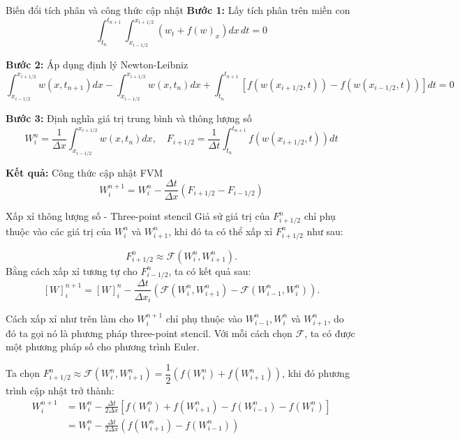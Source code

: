 \documentclass[aspectratio=43,10pt]{beamer}
\begin{document}
\begin{frame}{Biến đổi tích phân và công thức cập nhật}
\textbf{Bước 1:} Lấy tích phân trên miền con
$$\int_{t_n}^{t_{n+1}} \int_{x_{i-1/2}}^{x_{i+1/2}} \left( w_t + f(w)_x \right) dx \, dt = 0$$

\textbf{Bước 2:} Áp dụng định lý Newton-Leibniz
$$\int_{x_{i-1/2}}^{x_{i+1/2}} w(x, t_{n+1}) dx - \int_{x_{i-1/2}}^{x_{i+1/2}} w(x, t_n) dx + \int_{t_n}^{t_{n+1}} [f(w(x_{i+1/2}, t)) - f(w(x_{i-1/2}, t))] dt = 0$$

\textbf{Bước 3:} Định nghĩa giá trị trung bình và thông lượng số
$$W_i^n = \frac{1}{\Delta x}\int_{x_{i-1/2}}^{x_{i+1/2}} w(x, t_n) dx, \quad F_{i+1/2} = \frac{1}{\Delta t}\int_{t_n}^{t_{n+1}} f(w(x_{i+1/2}, t)) dt$$

\textbf{Kết quả:} Công thức cập nhật FVM
$$W_i^{n+1} = W_i^n - \frac{\Delta t}{\Delta x} \left( F_{i+1/2} - F_{i-1/2} \right)$$
\end{frame}

\begin{frame}{Xấp xỉ thông lượng số - Three-point stencil}
Giả sử giá trị của $F^n_{i+1/2}$ chỉ phụ thuộc vào các giá trị của $W_i^n$ và $W_{i+1}^{n}$, khi đó ta có thể xấp xỉ $F^n_{i+1/2}$ như sau:

\[
F^n_{i+1/2} \approx \mathcal{F} (W_i^n, W^n_{i+1}).
\]
Bằng cách xấp xỉ tương tự cho $F^n_{i-1/2}$, ta có kết quả sau:
\[
[W]_i^{n+1} = [W]_i^n - \frac{\Delta t}{\Delta x_i} \left( \mathcal{F} (W_i^n, W^n_{i+1}) - \mathcal{F} (W_{i-1}^n, W^n_{i})\right).
\]

Cách xấp xỉ như trên làm cho $W_i^{n+1}$ chỉ phụ thuộc vào $W_{i-1}^{n}, W_i^{n}$ và $W_{i+1}^{n}$, do đó ta gọi nó là phương pháp three-point stencil. Với mỗi cách chọn $\mathcal{F}$, ta có được một phương pháp số cho phương trình Euler.

Ta chọn $F^n_{i+1/2} \approx \mathcal{F} (W_i^n, W^n_{i+1}) = \dfrac{1}{2}(f(W_i^n) + f(W_{i+1}^n))$, khi đó phương trình cập nhật trở thành:
\begin{align*}
    W_i^{n+1} &=  W_i^n - \frac{\Delta t}{2\Delta x} \left[ f(W_i^n) + f(W_{i+1}^n) - f(W_{i-1}^n) - f(W_i^n) \right] \\ 
    &= W_i^n - \frac{\Delta t}{2\Delta x} \left( f(W_{i+1}^n) - f(W_{i-1}^n)\right) 
\end{align*}


\end{frame}
\end{document}
